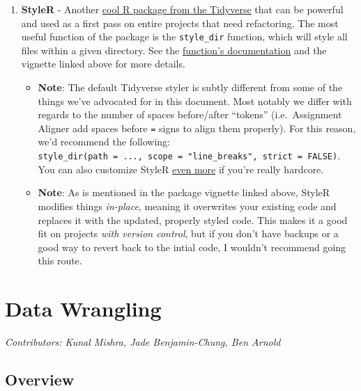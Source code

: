 \documentclass[
]{book}
\providecommand{\tightlist}{%
  \setlength{\itemsep}{0pt}\setlength{\parskip}{0pt}}
\begin{document}
\begin{enumerate}
\def\labelenumi{\arabic{enumi}.}
\setcounter{enumi}{2}
\tightlist
\item
  \textbf{StyleR} - Another \href{https://www.tidyverse.org/articles/2017/12/styler-1.0.0/}{cool R package from the Tidyverse} that can be powerful and used as a first pass on entire projects that need refactoring. The most useful function of the package is the \texttt{style\_dir} function, which will style all files within a given directory. See the \href{https://www.rdocumentation.org/packages/styler/versions/1.1.0/topics/style_dir}{function's documentation} and the vignette linked above for more details.

  \begin{itemize}
  \tightlist
  \item
    \textbf{Note}: The default Tidyverse styler is subtly different from some of the things we've advocated for in this document. Most notably we differ with regards to the number of spaces before/after ``tokens'' (i.e.~Assignment Aligner add spaces before \texttt{=} signs to align them properly). For this reason, we'd recommend the following: \texttt{style\_dir(path\ =\ ...,\ scope\ =\ "line\_breaks",\ strict\ =\ FALSE)}. You can also customize StyleR \href{http://styler.r-lib.org/articles/customizing_styler.html}{even more} if you're really hardcore.
  \item
    \textbf{Note}: As is mentioned in the package vignette linked above, StyleR modifies things \emph{in-place}, meaning it overwrites your existing code and replaces it with the updated, properly styled code. This makes it a good fit on projects \emph{with version control}, but if you don't have backups or a good way to revert back to the intial code, I wouldn't recommend going this route.
  \end{itemize}
\end{enumerate}

\hypertarget{datawrangling}{%
\chapter{Data Wrangling}\label{datawrangling}}

\emph{Contributors: Kunal Mishra, Jade Benjamin-Chung, Ben Arnold}

\hypertarget{overview}{%
\section{Overview}\label{overview}}
\end{document}
